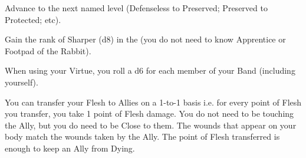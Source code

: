\begin{multicols*}{2}

Advance   to the next named level (Defenseless to Preserved; Preserved to Protected; etc).


Gain the rank of Sharper (d8) in the  (you do not need to know Apprentice or Footpad of the Rabbit).


\cbreak


When using your  Virtue, you roll a d6 for each member of your Band (including yourself).


You can transfer your Flesh to Allies on a 1-to-1 basis i.e. for every point of Flesh you transfer, you take 1 point of Flesh damage. You do not need to be touching the Ally, but you do need to be Close to them.  The wounds that appear on your body match the wounds taken by the Ally.  The point of Flesh transferred is enough to keep an Ally from Dying.

\end{multicols*}
